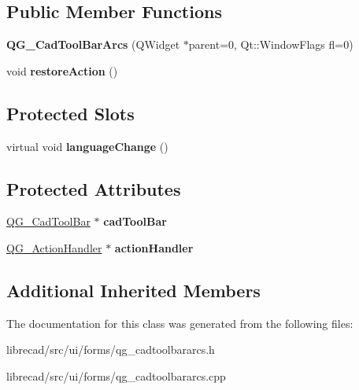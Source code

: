 \subsection*{Public Member Functions}
\begin{DoxyCompactItemize}
\item 
\hypertarget{classQG__CadToolBarArcs_a4d26f26d802e2d54fa96d8b080f16898}{{\bfseries Q\-G\-\_\-\-Cad\-Tool\-Bar\-Arcs} (Q\-Widget $\ast$parent=0, Qt\-::\-Window\-Flags fl=0)}\label{classQG__CadToolBarArcs_a4d26f26d802e2d54fa96d8b080f16898}

\item 
\hypertarget{classQG__CadToolBarArcs_ab7839b80ed80e99472410e37284f7ba9}{void {\bfseries restore\-Action} ()}\label{classQG__CadToolBarArcs_ab7839b80ed80e99472410e37284f7ba9}

\end{DoxyCompactItemize}
\subsection*{Protected Slots}
\begin{DoxyCompactItemize}
\item 
\hypertarget{classQG__CadToolBarArcs_abdc8e68becc727bfa638a2cf839c3708}{virtual void {\bfseries language\-Change} ()}\label{classQG__CadToolBarArcs_abdc8e68becc727bfa638a2cf839c3708}

\end{DoxyCompactItemize}
\subsection*{Protected Attributes}
\begin{DoxyCompactItemize}
\item 
\hypertarget{classQG__CadToolBarArcs_af03248e8b835ca8a94da409bbd289f40}{\hyperlink{classQG__CadToolBar}{Q\-G\-\_\-\-Cad\-Tool\-Bar} $\ast$ {\bfseries cad\-Tool\-Bar}}\label{classQG__CadToolBarArcs_af03248e8b835ca8a94da409bbd289f40}

\item 
\hypertarget{classQG__CadToolBarArcs_ac0073b864a4bc961a156da760b724392}{\hyperlink{classQG__ActionHandler}{Q\-G\-\_\-\-Action\-Handler} $\ast$ {\bfseries action\-Handler}}\label{classQG__CadToolBarArcs_ac0073b864a4bc961a156da760b724392}

\end{DoxyCompactItemize}
\subsection*{Additional Inherited Members}


The documentation for this class was generated from the following files\-:\begin{DoxyCompactItemize}
\item 
librecad/src/ui/forms/qg\-\_\-cadtoolbararcs.\-h\item 
librecad/src/ui/forms/qg\-\_\-cadtoolbararcs.\-cpp\end{DoxyCompactItemize}
